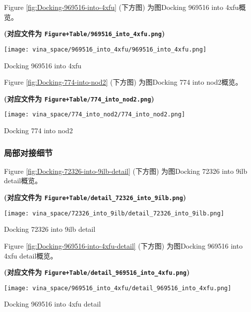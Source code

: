 \documentclass[
]{article}
\begin{document}
Figure \ref{fig:Docking-969516-into-4xfu} (下方图) 为图Docking 969516 into 4xfu概览。

\textbf{(对应文件为 \texttt{Figure+Table/969516\_into\_4xfu.png})}

\def\@captype{figure}
\begin{center}
\texttt{[image: vina\_space/969516\_into\_4xfu/969516\_into\_4xfu.png]}
\caption{Docking 969516 into 4xfu}\label{fig:Docking-969516-into-4xfu}
\end{center}

Figure \ref{fig:Docking-774-into-nod2} (下方图) 为图Docking 774 into nod2概览。

\textbf{(对应文件为 \texttt{Figure+Table/774\_into\_nod2.png})}

\def\@captype{figure}
\begin{center}
\texttt{[image: vina\_space/774\_into\_nod2/774\_into\_nod2.png]}
\caption{Docking 774 into nod2}\label{fig:Docking-774-into-nod2}
\end{center}

\hypertarget{ux5c40ux90e8ux5bf9ux63a5ux7ec6ux8282}{%
\subsubsection{局部对接细节}\label{ux5c40ux90e8ux5bf9ux63a5ux7ec6ux8282}}

Figure \ref{fig:Docking-72326-into-9ilb-detail} (下方图) 为图Docking 72326 into 9ilb detail概览。

\textbf{(对应文件为 \texttt{Figure+Table/detail\_72326\_into\_9ilb.png})}

\def\@captype{figure}
\begin{center}
\texttt{[image: vina\_space/72326\_into\_9ilb/detail\_72326\_into\_9ilb.png]}
\caption{Docking 72326 into 9ilb detail}\label{fig:Docking-72326-into-9ilb-detail}
\end{center}

Figure \ref{fig:Docking-969516-into-4xfu-detail} (下方图) 为图Docking 969516 into 4xfu detail概览。

\textbf{(对应文件为 \texttt{Figure+Table/detail\_969516\_into\_4xfu.png})}

\def\@captype{figure}
\begin{center}
\texttt{[image: vina\_space/969516\_into\_4xfu/detail\_969516\_into\_4xfu.png]}
\caption{Docking 969516 into 4xfu detail}\label{fig:Docking-969516-into-4xfu-detail}
\end{center}
\end{document}
